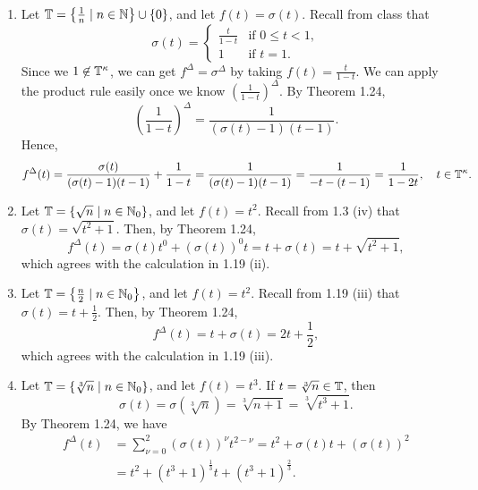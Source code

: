 \documentclass[nonumber]{homework}
\begin{document}
	\begin{enumerate}[label={\bf (\roman*)}]
		\item Let $\mathbb{T} = \left\{\frac{1}{n} \mid n \in \mathbb{N}\right\}\cup\{0\}$, and let $f(t) = \sigma(t)$. Recall from class that
		\begin{equation*}
			\sigma(t) = \begin{cases}
				\frac{t}{1-t} & \text{if } 0 \le t < 1, \\
				1 & \text{if } t = 1.
			\end{cases}
		\end{equation*}
		Since we $1 \not \in \mathbb{T}^\kappa$, we can get $f^\Delta = \sigma^\Delta$ by taking $f(t) = \frac{t}{1-t}$. We can apply the product rule easily once we know $\left(\frac{1}{1-t}\right)^\Delta$. By Theorem 1.24,
		\begin{equation*}
			\left(\frac{1}{1-t}\right)^\Delta = \frac{1}{(\sigma(t) -1)(t-1)}.
		\end{equation*}
		Hence,
		\begin{equation*}
			f^\Delta(t) = \frac{\sigma(t)}{(\sigma(t) - 1)(t-1)} + \frac{1}{1-t} = \frac{1}{(\sigma(t) -1)(t-1)} = \frac{1}{-t - (t-1)} = \frac{1}{1-2t} , \quad t \in \mathbb{T}^\kappa.
		\end{equation*}
		
		\item Let $\mathbb{T} = \{\sqrt{n}\mid n \in \mathbb{N}_0\}$, and let $f(t) = t^2$. Recall from 1.3 (iv) that $\sigma(t) = \sqrt{t^2+1}$. Then, by Theorem 1.24,
		\begin{equation*}
			f^\Delta(t) = \sigma(t)t^0 + (\sigma(t))^0t = t + \sigma(t) = t + \sqrt{t^2+1},
		\end{equation*}
		which agrees with the calculation in 1.19 (ii).
		
		\item Let $\mathbb{T} = \left\{\frac{n}{2} \mid n \in \mathbb{N}_0\right\}$, and let $f(t) = t^2$. Recall from 1.19 (iii) that $\sigma(t) = t + \frac{1}{2}$. Then, by Theorem 1.24,
		\begin{equation*}
			f^\Delta(t) = t + \sigma(t) = 2t + \frac{1}{2},
		\end{equation*}
		which agrees with the calculation in 1.19 (iii).
		
		\item Let $\mathbb{T} = \{\sqrt[3]{n} \mid n \in \mathbb{N}_0\}$, and let $f(t) = t^3$. If $t = \sqrt[3]{n} \in \mathbb{T}$, then
		\begin{equation*}
			\sigma(t) = \sigma(\sqrt[3]{n}) = \sqrt[3]{n+1} = \sqrt[3]{t^3+1}.
		\end{equation*}
		By Theorem 1.24, we have
		\begin{align*}
			f^\Delta(t) &= \sum_{\nu=0}^2 (\sigma(t))^\nu t^{2-\nu} = t^2 + \sigma(t)t + (\sigma(t))^2 \\
			&= t^2 + (t^3+1)^\frac{1}{3}t + (t^3+1)^\frac{2}{3}.
		\end{align*}
		
	\end{enumerate}
	
\end{document}
